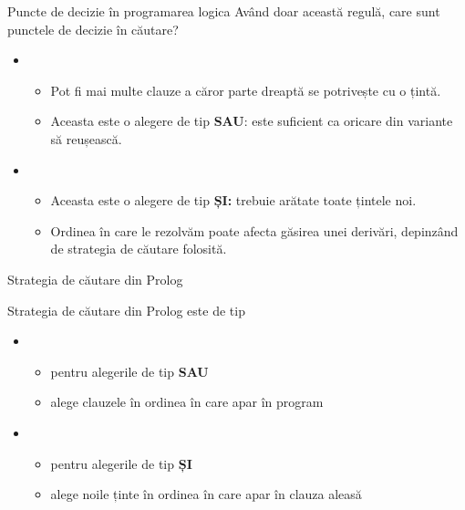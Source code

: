 \documentclass[xcolor=pdftex,romanian,colorlinks]{beamer}
\begin{document}
\begin{frame}{Puncte de decizie în programarea logica}
Având doar această regulă, care sunt punctele de decizie în căutare?
\begin{itemize}
	 
	\item {}
	\begin{itemize}
		\item Pot fi mai multe clauze a căror parte dreaptă se potrivește cu o țintă.
		\item Aceasta este o alegere de tip \textbf{SAU}: este suficient ca oricare din variante să reușească.
	\end{itemize}
	
	\medskip  
	\item {}
	\begin{itemize}
		\item Aceasta este o alegere de tip \textbf{ȘI:} trebuie arătate toate țintele noi.
		\item Ordinea în care le rezolvăm poate afecta găsirea unei derivări, depinzând de strategia de căutare folosită.
	\end{itemize}
\end{itemize}
\end{frame}

\begin{frame}{Strategia de căutare din Prolog}

Strategia de căutare din Prolog este de tip 
\medskip
\begin{itemize}
	\item {}
	\begin{itemize}
		\item pentru alegerile de tip \textbf{SAU}
		\item alege clauzele în ordinea în care apar în program
	\end{itemize}
	\medskip
	\item {}
	\begin{itemize}
		\item pentru alegerile de tip \textbf{ȘI}
		\item alege noile ținte în ordinea în care apar în clauza aleasă
	\end{itemize}
\end{itemize}

\end{frame}
\end{document}
